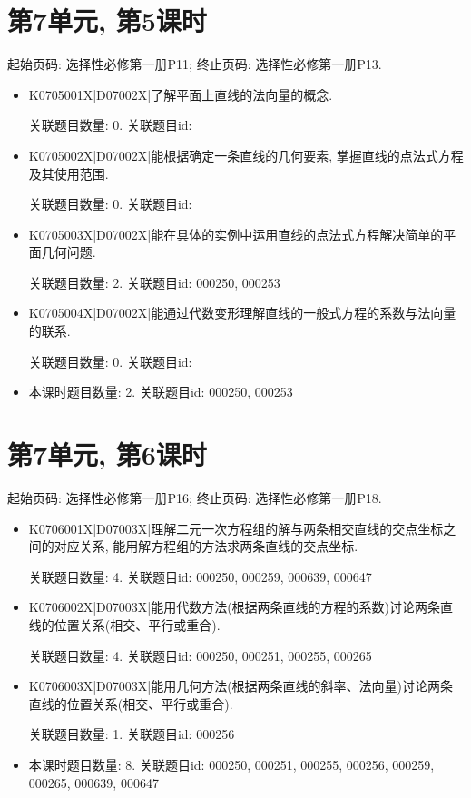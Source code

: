 \section*{第7单元, 第5课时}
起始页码: 选择性必修第一册P11; 终止页码: 选择性必修第一册P13.
\begin{itemize}
\item K0705001X|D07002X|了解平面上直线的法向量的概念.

关联题目数量: 0. 关联题目id: 

\item K0705002X|D07002X|能根据确定一条直线的几何要素, 掌握直线的点法式方程及其使用范围.

关联题目数量: 0. 关联题目id: 

\item K0705003X|D07002X|能在具体的实例中运用直线的点法式方程解决简单的平面几何问题.

关联题目数量: 2. 关联题目id: 000250, 000253

\item K0705004X|D07002X|能通过代数变形理解直线的一般式方程的系数与法向量的联系.

关联题目数量: 0. 关联题目id: 

\item 本课时题目数量: 2. 关联题目id: 000250, 000253

\end{itemize}

\section*{第7单元, 第6课时}
起始页码: 选择性必修第一册P16; 终止页码: 选择性必修第一册P18.
\begin{itemize}
\item K0706001X|D07003X|理解二元一次方程组的解与两条相交直线的交点坐标之间的对应关系, 能用解方程组的方法求两条直线的交点坐标.

关联题目数量: 4. 关联题目id: 000250, 000259, 000639, 000647

\item K0706002X|D07003X|能用代数方法(根据两条直线的方程的系数)讨论两条直线的位置关系(相交、平行或重合).

关联题目数量: 4. 关联题目id: 000250, 000251, 000255, 000265

\item K0706003X|D07003X|能用几何方法(根据两条直线的斜率、法向量)讨论两条直线的位置关系(相交、平行或重合).

关联题目数量: 1. 关联题目id: 000256

\item 本课时题目数量: 8. 关联题目id: 000250, 000251, 000255, 000256, 000259, 000265, 000639, 000647

\end{itemize}

